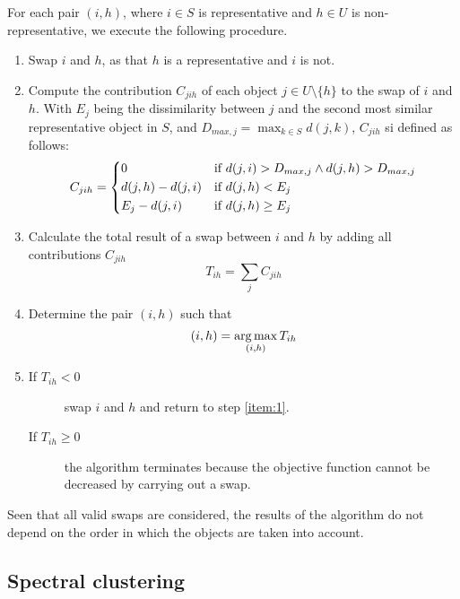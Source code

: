 For each pair $(i,h)$, where $i \in S$ is representative and $h \in U$ is non-representative, we execute the following procedure.
\begin{enumerate}
    \item Swap $i$ and $h$, as that $h$ is a representative and $i$ is not.\label{item:1}
    \item Compute the contribution $C_{jih}$ of each object $j \in U\setminus \{h\}$ to the swap of $i$ and $h$. With $E_j$ being the dissimilarity between $j$ and the second most similar representative object in $S$, and $D_{max,j} = \max_{k\in S}{d(j,k)}$, $C_{jih}$ si defined as follows:
    \begin{equation*}
        C_{jih}=
        \begin{dcases}
            0 & \text{if } d(j,i)> D_{max,j}\land d(j,h)> D_{max,j}\\
            d(j,h)-d(j,i) & \text{if } d(j,h)<E_j  \\
            E_j-d(j,i) & \text{if } d(j,h)\geq E_j \\
        \end{dcases}
    \end{equation*}  
    \item Calculate the total result of a swap between $i$ and $h$ by adding all contributions $C_{jih}$
    \begin{equation*}
        T_{ih}=\sum_j{C_{jih}}
    \end{equation*}
    \item Determine the pair $(i,h)$ such that
    \begin{equation*}
        (i,h)=\operatorname*{arg\,max}_{(i,h)}{T_{ih}}
    \end{equation*}
    \item 
    \begin{description}
        \item[If $T_{ih}<0$] swap $i$ and $h$ and return to step \ref{item:1}.
        \item[If $T_{ih}\geq 0$] the algorithm terminates because the objective function cannot be decreased by carrying out a swap.
    \end{description}
\end{enumerate}
Seen that all valid swaps are considered, the results of the algorithm do not depend on the order in which the objects are taken into account.

\subsection{Spectral clustering}\label{clustering_spectral}